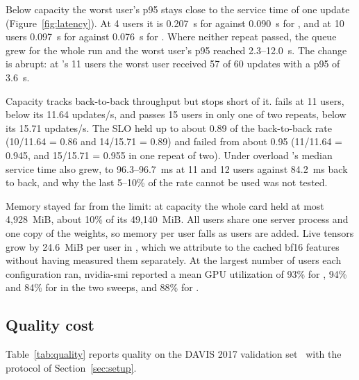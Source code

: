 Below capacity the worst user's p95 stays close to the service time of one update (Figure~\ref{fig:latency}). %
At 4 users it is 0.207~s for \serial{} against 0.090~s for \opt{}, and at 10 users 0.097~s for \opt{} against 0.076~s for \optd{}. %
Where neither repeat passed, the queue grew for the whole run and the worst user's p95 reached 2.3--12.0~s. %
The change is abrupt: at \opt{}'s 11 users the worst user received 57 of 60 updates with a p95 of 3.6~s. %

Capacity tracks back-to-back throughput but stops short of it.
\opt{} fails at 11 users, below its 11.64 updates/s, and \optd{} passes 15 users in only one of two repeats, below its 15.71 updates/s. %
The SLO held up to about 0.89 of the back-to-back rate (10/11.64 = 0.86 and 14/15.71 = 0.89) and failed from about 0.95 (11/11.64 = 0.945, and 15/15.71 = 0.955 in one repeat of two). %
Under overload \opt{}'s median service time also grew, to 96.3--96.7~ms at 11 and 12 users against 84.2~ms back to back, and why the last 5--10\% of the rate cannot be used was not tested. %

Memory stayed far from the limit: at capacity the whole card held at most 4,928~MiB, about 10\% of its 49,140~MiB. %
All users share one server process and one copy of the weights, so memory per user falls as users are added. %
Live tensors grow by 24.6~MiB per user in \opt{}, which we attribute to the cached bf16 features without having measured them separately. %
At the largest number of users each configuration ran, nvidia-smi reported a mean GPU utilization of 93\% for \serial{}, 94\% and 84\% for \opt{} in the two sweeps, and 88\% for \optd{}. %

\subsection{Quality cost}

Table~\ref{tab:quality} reports quality on the DAVIS 2017 validation set~\cite{davis2017} with the protocol of Section~\ref{sec:setup}. %

